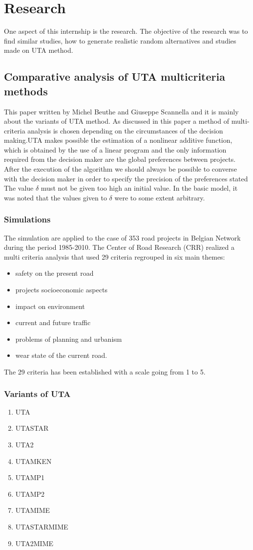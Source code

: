 \documentclass{report}
\begin{document}
\section{Research}
One aspect of this internship is the research. The objective of the research was to find similar studies, how to generate realistic random alternatives and studies made on UTA method.
\subsection{Comparative analysis of UTA multicriteria methods}
This paper written by Michel Beuthe and Giuseppe Scannella and it is mainly about the variants of UTA method. As discussed in this paper a method of multi-criteria analysis is chosen depending on the circumstances of the decision making.UTA makes possible the estimation of a nonlinear additive function, which is obtained by the use of a linear program and the only information required from the decision maker are the global preferences between projects. \\
After the execution of the algorithm we should always be possible to converse with the decision maker in order to specify the precision of the preferences stated\\
The value $\delta$ must not be given too high an initial value. In the basic model, it was noted that the values given to $\delta$ were to some extent arbitrary. 
\subsubsection{Simulations}
The simulation are applied to the case of 353 road projects in Belgian Network during the period 1985-2010. The Center of Road Research (CRR) realized a multi criteria analysis  that used 29 criteria regrouped in six main themes: 
\begin{itemize}
\item safety on the present road
\item projects socioeconomic aspects
\item impact on environment
\item current and future traffic
\item problems of planning and urbanism
\item wear state of the current road.
\end{itemize}
The 29 criteria has been established with a scale going from 1 to 5. 

\subsubsection{Variants of UTA}
\begin{enumerate}
\item UTA
\item UTASTAR
\item UTA2
\item UTAMKEN
\item UTAMP1
\item UTAMP2
\item UTAMIME
\item UTASTARMIME
\item UTA2MIME
\end{enumerate}
\end{document}

